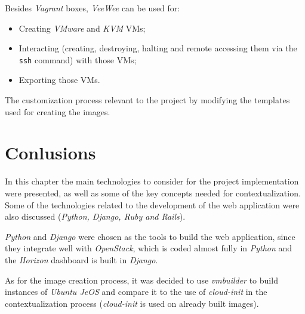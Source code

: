 Besides \textit{Vagrant} boxes, \textit{VeeWee} can be used for:

\begin{itemize}
\item Creating \textit{VMware} and \textit{KVM} VMs;
\item Interacting (creating, destroying, halting and remote accessing them via the \texttt{ssh} command) with those VMs;
\item Exporting those VMs.
\end{itemize}

The customization process relevant to the project by modifying the templates used for creating the images.

\section{Conlusions}\label{sota:concl}

In this chapter the main technologies to consider for the project implementation were presented, as well as some of the key concepts needed for contextualization. Some of the technologies related to the development of the web application were also discussed (\textit{Python, Django, Ruby and Rails}).

\textit{Python} and \textit{Django} were chosen as the tools to build the web application, since they integrate well with \textit{OpenStack}, which is coded almost fully in \textit{Python} and the \textit{Horizon} dashboard is built in \textit{Django}.

As for the image creation process, it was decided to use \textit{vmbuilder} to build instances of \textit{Ubuntu JeOS} and compare it to the use of \textit{cloud-init} in the contextualization process (\textit{cloud-init} is used on already built images).
